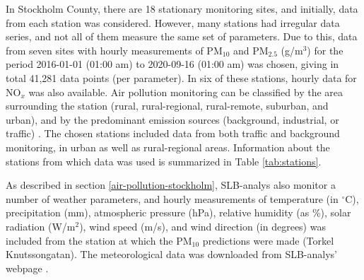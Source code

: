 In Stockholm County, there are 18 stationary monitoring sites, and initially, data from each station was considered. However, many stations had irregular data series, and not all of them measure the same set of parameters. Due to this, data from seven sites with hourly measurements of PM$_{10}$ and PM$_{2.5}$ (\textmugreek g/m$^3$) for the period 2016-01-01 (01:00 am) to 2020-09-16 (01:00 am) was chosen, giving in total 41,281 data points (per parameter). In six of these stations, hourly data for NO$_x$ was also available. Air pollution monitoring can be classified by the area surrounding the station (rural, rural-regional, rural-remote, suburban, and urban), and by the predominant emission sources (background, industrial, or traffic) \cite{smhi-luftmatningar}. The chosen stations included data from both traffic and background monitoring, in urban as well as rural-regional areas. Information about the stations from which data was used is summarized in Table \ref{tab:stations}. 

As described in section \ref{air-pollution-stockholm}, SLB-analys also monitor a number of weather parameters, and hourly measurements of temperature (in $^\circ$C), precipitation (mm), atmospheric pressure (hPa), relative humidity (as \%), solar radiation (W/m$^2$), wind speed (m/s), and wind direction (in degrees) was included from the station at which the PM$_{10}$ predictions were made (Torkel Knutssongatan). The meteorological data was downloaded from SLB-analys' webpage \cite{slb-analys-meteorologi}. 


